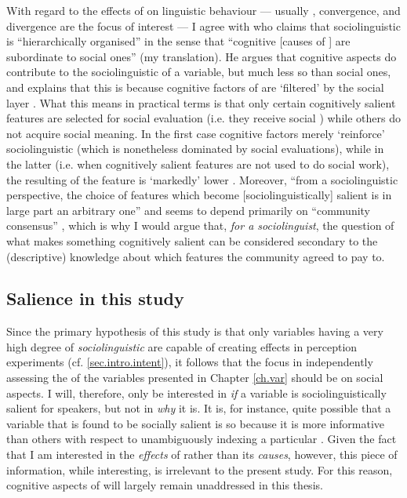With regard to the effects of  on linguistic behaviour --- usually , convergence, and divergence are the focus of interest --- I agree with \textcite[17]{auer2014} who claims that sociolinguistic  is ``hierarchically organised'' in the sense that ``cognitive [causes of ] are subordinate to social ones'' (my translation).
He argues that cognitive aspects do contribute to the sociolinguistic  of a variable, but much less so than social ones, and explains that this is because cognitive factors of  are `filtered' by the social layer \parencite[cf.][18]{auer2014}.
What this means in practical terms is that only certain cognitively salient features are selected for social evaluation (i.e. they receive social ) while others do not acquire social meaning.
In the first case cognitive factors merely `reinforce' sociolinguistic  (which is nonetheless dominated by social evaluations), while in the latter (i.e. when cognitively salient features are not used to do social work), the resulting  of the feature is `markedly' lower \parencite[cf.][18]{auer2014}.
Moreover, \enquote{from a sociolinguistic perspective, the choice of features which become [sociolinguistically] salient is in large part an arbitrary one} and seems to depend primarily on \enquote{community consensus} \parencite[56]{llamasetal2017}, which is why I would argue that, \emph{for a sociolinguist}, the question of what makes something cognitively salient can be considered secondary to the (descriptive) knowledge about which features the community agreed to pay  to.

		\subsection{Salience in this study}
		\label{sec.sal.sal.study}

Since the primary hypothesis of this study is that only variables having a very high degree of \emph{sociolinguistic}  are capable of creating  effects in perception experiments (cf. \ref{sec.intro.intent}), it follows that the focus in independently assessing the  of the variables presented in Chapter \ref{ch.var} should be on social aspects.
I will, therefore, only be interested in \emph{if} a variable is sociolinguistically salient for speakers, but not in \emph{why} it is.
It is, for instance, quite possible that a variable that is found to be socially salient is so because it is more informative than others with respect to unambiguously indexing a particular .
Given the fact that I am interested in the \emph{effects} of  rather than its \emph{causes}, however, this piece of information, while interesting, is irrelevant to the present study.
For this reason, cognitive aspects of  will largely remain unaddressed in this thesis.

